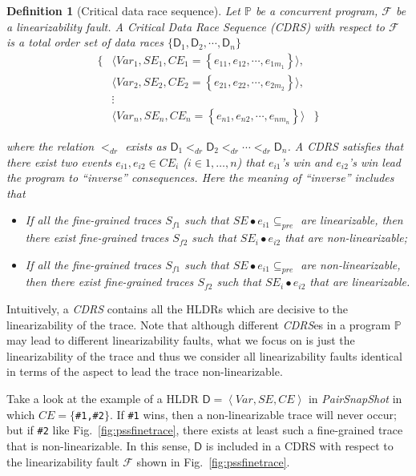 \documentclass[runningheads]{llncs}
\newcommand{\set}[1]{\left\{{#1}\right\}}
\newcommand{\dr}{\mathsf{D}}
\newtheorem{myDef}{Definition}
\begin{document}
\begin{myDef}[Critical data race sequence]\label{def:cdrs}
    Let  $\mathbb{P}$ be a concurrent program, $\mathcal{F}$ be a linearizability fault. A \textit{Critical Data Race Sequence} (\textit{CDRS}) with respect to
 $\mathcal{F}$ is a total order set of data races $\{\mathsf{D}_1,\mathsf{D}_2,\cdots,\mathsf{D}_n\}$
 \[
\begin{array}{ccc}
   \{& \langle\mathit{Var}_1, \mathit{SE}_1, \mathit{CE}_1 = \set{e_{11},e_{12},\cdots,e_{1m_1}}\rangle, & \\
   & \langle\mathit{Var}_2, \mathit{SE}_2, \mathit{CE}_2 = \set{e_{21},e_{22},\cdots,e_{2m_2}}\rangle, &\\
   & \vdots& \\
   &\langle \mathit{Var}_n, \mathit{SE}_n, \mathit{CE}_n = \set{e_{n1},e_{n2},\cdots,e_{nm_n}} \rangle&\}
\end{array}
\]

\noindent where the relation $<_{dr}$ exists as $\mathsf{D}_1 <_{dr} \dr_2 <_{dr} \cdots  <_{dr} \mathsf{D}_n$.
A CDRS satisfies that there exist two events $e_{i1}, e_{i2}\in \mathit{CE}_i$ ($i\in{1,\dots,n}$)   that $e_{i1}$'s win and
$e_{i2}$'s win lead the program to ``inverse'' consequences. Here the meaning of ``inverse'' includes that
\begin{itemize}
\item If all the fine-grained traces $S_{f1}$ such that $\mathit{SE}\bullet e_{i1} \subseteq_{pre}$ are linearizable, then there exist fine-grained traces $S_{f2}$ such that 
$\mathit{SE_i}\bullet e_{i2}$ that are non-linearizable;
\item If all the fine-grained traces $S_{f1}$ such that $\mathit{SE}\bullet e_{i1} \subseteq_{pre}$ are non-linearizable, then there exist fine-grained traces $S_{f2}$ such that 
$\mathit{SE_i}\bullet e_{i2}$ that are linearizable.\\
\end{itemize}
\end{myDef}


Intuitively, a \textit{CDRS} contains all the HLDRs which are decisive to the linearizability of the trace. Note that although different \textit{CDRS}es in a program $\mathbb{P}$ may lead to different linearizability faults, what we focus on is just the linearizability of the trace and thus we consider all linearizability faults identical in terms of the aspect to lead the trace non-linearizable.

\begin{example} 

Take a look at the example of a HLDR $\mathsf{D}  = \left\langle \mathit{Var}, \mathit{SE}, \mathit{CE}\right\rangle$  in \textit{PairSnapShot} in which $\mathit{CE} = \{$\texttt{\#1,\#2}$\}$. If \texttt{\#1} wins, then a non-linearizable trace will never occur; but if \texttt{\#2} like Fig.~\ref{fig:pssfinetrace}, there exists at least such a fine-grained trace that is non-linearizable. In this sense,  $\mathsf{D}$ is included in a CDRS with respect to the linearizability fault $\mathcal{F}$ shown in Fig.~\ref{fig:pssfinetrace}.

\end{example}
\end{document}
